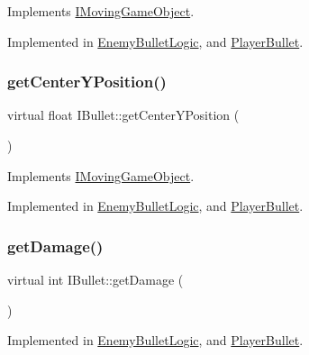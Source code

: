 Implements \hyperlink{class_i_moving_game_object_ae4e6c21094ef1e2db32729270c8a7999}{I\+Moving\+Game\+Object}.



Implemented in \hyperlink{class_enemy_bullet_logic_a39ffa8b7fabb84625a859691099652de}{Enemy\+Bullet\+Logic}, and \hyperlink{class_player_bullet_a73c27dca47ea3fdcecd82ce4b2089c4a}{Player\+Bullet}.

\mbox{\label{class_i_bullet_a8245ed2bc72beed1d69547ce5f87a021}} 
\subsubsection{\texorpdfstring{get\+Center\+Y\+Position()}{getCenterYPosition()}}
{\footnotesize\ttfamily virtual float I\+Bullet\+::get\+Center\+Y\+Position (\begin{DoxyParamCaption}{ }\end{DoxyParamCaption})\hspace{0.3cm}{\ttfamily [pure virtual]}}



Implements \hyperlink{class_i_moving_game_object_a075f69d69fd38dc02a0ec3c7b1cb0534}{I\+Moving\+Game\+Object}.



Implemented in \hyperlink{class_enemy_bullet_logic_a4c006085f2a11f68e8043bca67d3effe}{Enemy\+Bullet\+Logic}, and \hyperlink{class_player_bullet_a7ad2bc922595b9a11373fd42666926ef}{Player\+Bullet}.

\mbox{\label{class_i_bullet_ab6643a4ad3888ee4ebfbc3d445c4b73d}} 
\subsubsection{\texorpdfstring{get\+Damage()}{getDamage()}}
{\footnotesize\ttfamily virtual int I\+Bullet\+::get\+Damage (\begin{DoxyParamCaption}{ }\end{DoxyParamCaption})\hspace{0.3cm}{\ttfamily [pure virtual]}}



Implemented in \hyperlink{class_enemy_bullet_logic_a08dd084364fc7efc689a7f98e1cee688}{Enemy\+Bullet\+Logic}, and \hyperlink{class_player_bullet_a55375b5c3f4f87d00daba1cda12b1e79}{Player\+Bullet}.

